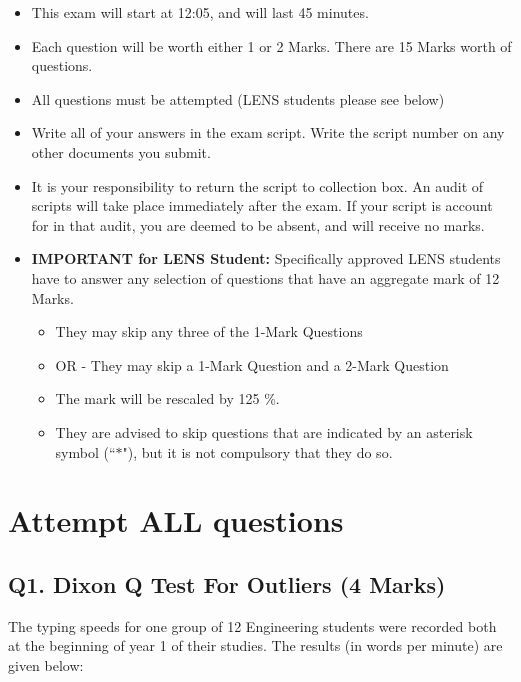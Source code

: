 \documentclass[a4paper,12pt]{article}
\begin{document}
\begin{itemize} 
	\item This exam will start at 12:05, and will last 45 minutes.
	
	\item Each question will be worth either 1 or 2 Marks. There are 15 Marks worth of questions.
	\item All questions must be attempted (LENS students please see below)
	
	\item Write all of your answers in the exam script. Write the script number on any other documents you submit.
	
	\item It is your responsibility to return the script to collection box. An audit of scripts will take place immediately after the exam. If your script is account for in that audit,  you are deemed to be absent, and will receive no marks.
	
	\item \textbf{IMPORTANT for LENS Student:}
	Specifically approved LENS students have to answer any selection of questions that have an aggregate mark of 12 Marks.  
	\begin{itemize}
		\item They may skip any three of the 1-Mark Questions
		\item OR - They may skip a 1-Mark Question and a 2-Mark Question
		\item The mark will be rescaled by 125 \%.
		\item They are advised to skip questions that are indicated by an asterisk symbol (``$\ast$"), but it is not compulsory that they do so.
	\end{itemize}
	
	
\end{itemize}
\newpage
\section*{Attempt ALL questions}

\bigskip
\subsection*{Q1. Dixon Q Test For Outliers (4 Marks)}

The typing speeds for one group of 12 Engineering students were recorded both at the beginning of year 1 of their studies. The results (in words per minute) are given below:
\end{document}
